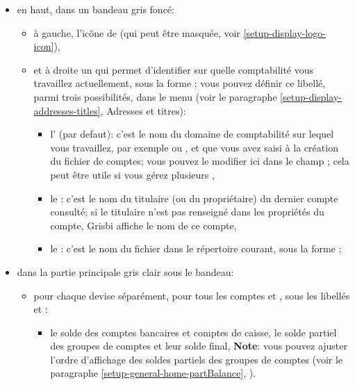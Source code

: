 \begin{itemize}
	\item en haut, dans un bandeau gris foncé:
		\begin{itemize}
	 		\item à gauche, l'icône de  (qui peut être masquée, voir \vref{setup-display-logo-icon}),
	 		\item et à droite un  qui permet d'identifier sur quelle comptabilité vous travaillez actuellement, sous la forme ; vous pouvez définir ce libellé, parmi trois possibilités, dans le menu  (voir le paragraphe \vref{setup-display-addresses-titles}, Adresses et titres):
				\begin{itemize}
			 		\item l' (par defaut): c'est le nom du domaine de comptabilité sur lequel vous travaillez, par exemple  ou , et que vous avez saisi à la création du fichier de comptes; vous pouvez le modifier ici dans le champ ; cela peut être utile si vous gérez plusieurs , 
			 		\item le : c'est le nom du titulaire (ou du propriétaire) du dernier compte consulté; si le titulaire n'est pas renseigné dans les propriétés du compte, Grisbi affiche le nom de ce compte,
			 		\item le : c'est le nom du fichier dans le répertoire courant, sous la forme ;
				\end{itemize}
		\end{itemize}
	\item dans la partie principale gris clair sous le bandeau:
		\begin{itemize} 
			\item pour chaque devise séparément, pour tous les comptes et , sous les libellés  et :
				\begin{itemize}
					\item le solde des comptes bancaires et comptes de caisse, le solde partiel des groupes de comptes et leur solde final,
			\newline
			\textbf{Note}: vous pouvez ajuster l'ordre d'affichage des soldes partiels des groupes de comptes (voir le paragraphe \vref{setup-general-home-partBalance}, ).			 

\end{itemize}
\end{itemize}
\end{itemize}
